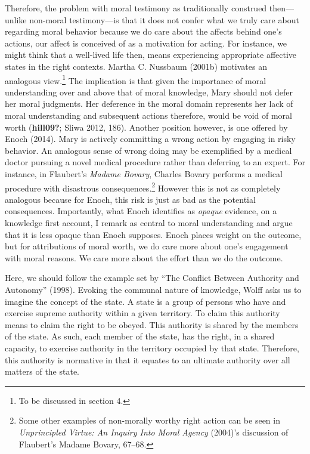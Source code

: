 \documentclass[12pt]{book}
\theoremstyle{definition}
\theoremstyle{remark}
\begin{document}
Therefore, the problem with moral testimony as traditionally construed then---unlike non-moral testimony---is that it does not confer what we truly care about regarding moral behavior because we do care about the affects behind one's actions, our affect is conceived of as a motivation for acting. For instance, we might think that a well-lived life then, means experiencing appropriate affective states in the right contexts. Martha C. Nussbaum (2001b) motivates an analogous view.\footnote{To be discussed in section 4.} The implication is that given the importance of moral understanding over and above that of moral knowledge, Mary should not defer her moral judgments. Her deference in the moral domain represents her lack of moral understanding and subsequent actions therefore, would be void of moral worth (\textbf{hill09?}; Sliwa 2012, 186). Another position however, is one offered by Enoch (2014). Mary is actively committing a wrong action by engaging in risky behavior. An analogous sense of wrong doing may be exemplified by a medical doctor pursuing a novel medical procedure rather than deferring to an expert. For instance, in Flaubert's \emph{Madame Bovary}, Charles Bovary performs a medical procedure with disastrous consequences.\footnote{ Some other examples of non-morally worthy right action can be seen in \emph{Unprincipled {Virtue}: {An Inquiry Into Moral Agency}} (2004)'s discussion of Flaubert's Madame Bovary, 67--68.} However this is not as completely analogous because for Enoch, this risk is just as bad as the potential consequences. Importantly, what Enoch identifies as \emph{opaque} evidence, on a knowledge first account, I remark as central to moral understanding and argue that it is less opaque than Enoch supposes. Enoch places weight on the outcome, but for attributions of moral worth, we do care more about one's engagement with moral reasons. We care more about the effort than we do the outcome.

Here, we should follow the example set by {``The {Conflict Between Authority} and {Autonomy}''} (1998). Evoking the communal nature of knowledge, Wolff asks us to imagine the concept of the state. A state is a group of persons who have and exercise supreme authority within a given territory. To claim this authority means to claim the right to be obeyed. This authority is shared by the members of the state. As such, each member of the state, has the right, in a shared capacity, to exercise authority in the territory occupied by that state. Therefore, this authority is normative in that it equates to an ultimate authority over all matters of the state.
\end{document}
